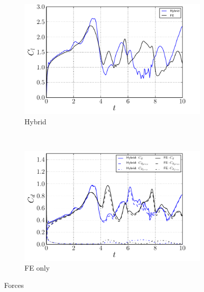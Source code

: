 	\begin{figure}[!p]
     \centering
     \begin{subfigure}[t]{0.49\textwidth}
             \includegraphics[width=\textwidth]{./figures/validation/ellipse/hybrid_ellipseForce_CL.pdf}
             \caption{Hybrid}
             \label{fig:hybrid_ellipseForce_CL}
     \end{subfigure}%
     ~ %
     \begin{subfigure}[t]{0.49\textwidth}
             \includegraphics[width=\textwidth]{./figures/validation/ellipse/hybrid_ellipseForce_CD.pdf}
             \caption{FE only}
             \label{fig:hybrid_ellipseForce_CD}
     \end{subfigure}
     \caption{Forces}
     \label{fig:hybrid_ellipseForce}
	\end{figure}	

